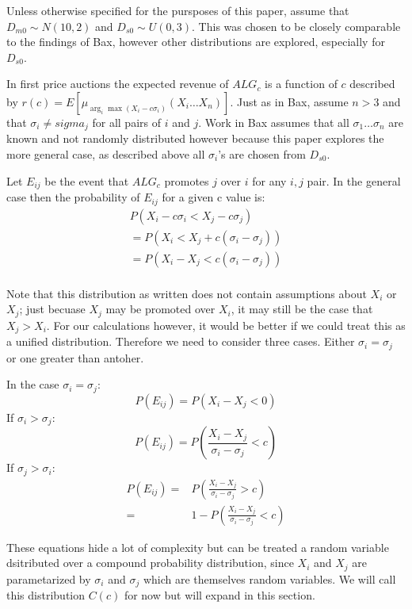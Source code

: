 \documentclass[11pt]{article}
\begin{document}
\begin{multicols}{2}
Unless otherwise specified for the pursposes of this paper, assume that $D_{m0} \sim N(10,2)$ and $D_{s0} \sim U(0,3)$.
This was chosen to be closely comparable to the findings of Bax, however other distributions are explored, especially for $D_{s0}$.

In first price auctions the expected revenue of $ALG_c$ is a function of $c$ described by $r(c) = E[\mu_{\arg_i\max(X_i-c\sigma_i)}(X_i \dots X_n)]$.
Just as in Bax, assume $n>3$ and that $\sigma_i \ne sigma_j$ for all pairs of $i$ and $j$.
Work in Bax assumes that all $\sigma_1 \dots \sigma_n$ are known and not randomly distributed however because this paper explores the more general case, as described above all $\sigma_i$'s are chosen from $D_{s0}$.

Let $E_{ij}$ be the event that $ALG_c$ promotes $j$ over $i$ for any $i,j$ pair.
In the general case then the probability of $E_{ij}$ for a given c value is:
$$
\begin{aligned}
P(X_i - c \sigma_i < X_j - c \sigma_j)\\
= P(X_i < X_j + c( \sigma_i-  \sigma_j))\\
= P(X_i - X_j < c( \sigma_i-  \sigma_j))\\
\end{aligned}
$$

Note that this distribution as written does not contain assumptions about $X_i$ or $X_j$; just becuase $X_j$ may be promoted over $X_i$, it may still be the case that $X_j > X_i$.
For our calculations however, it would be better if we could treat this as a unified distribution.
Therefore we need to consider three cases.
Either $\sigma_i = \sigma_j$ or one greater than antoher.

In the case $\sigma_i = \sigma_j$: $$P(E_{ij}) = P(X_i - X_j < 0)$$
If $\sigma_i > \sigma_j$: $$P(E_{ij}) = P(\frac{X_i - X_j}{\sigma_i-  \sigma_j} <  c)$$
If $\sigma_j > \sigma_i$:
$$
\begin{aligned}
P(E_{ij}) =& P(\frac{X_i - X_j}{\sigma_i-  \sigma_j} >  c)\\
=& 1 - P(\frac{X_i - X_j}{\sigma_i-  \sigma_j} <  c)
\end{aligned}
$$

These equations hide a lot of complexity but can be treated a random variable dsitributed over a compound probability distribution, since $X_i$ and $X_j$ are parametarized by $\sigma_i$ and $\sigma_j$ which are themselves random variables.
We will call this distribution $C(c)$ for now but will expand in this section.


\end{multicols}
\end{document}
